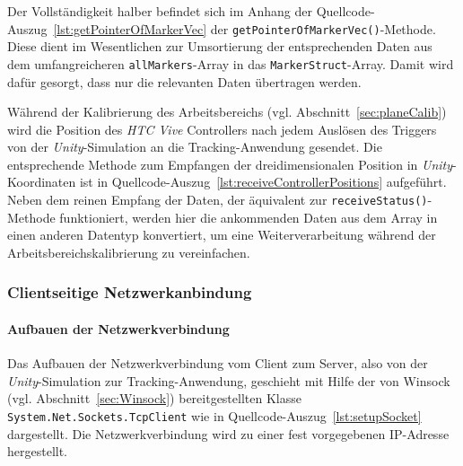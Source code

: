  

Der Vollständigkeit halber befindet sich im Anhang der Quellcode-Auszug~\ref{lst:getPointerOfMarkerVec} der \texttt{get\-Pointer\-Of\-Marker\-Vec()}-Methode. Diese dient im Wesentlichen zur Umsortierung der entsprechenden Daten aus dem umfangreicheren \texttt{allMarkers}-Array in das \texttt{Marker\-Struct}-Array. Damit wird dafür gesorgt, dass nur die relevanten Daten übertragen werden. 

 

Während der Kalibrierung des Arbeitsbereichs (vgl. Abschnitt~\ref{sec:planeCalib}) wird die Position des \emph{HTC Vive} Controllers nach jedem Auslösen des Triggers von der \textit{Unity}-Simulation an die Tracking-Anwendung gesendet. Die entsprechende Methode zum Empfangen der dreidimensionalen Position in \emph{Unity}-Koordinaten ist in Quellcode-Auszug~\ref{lst:receiveControllerPositions} aufgeführt. Neben dem reinen Empfang der Daten, der äquivalent zur \texttt{receive\-Status()}-Methode funktioniert, werden hier die ankommenden Daten aus dem Array in einen anderen Datentyp konvertiert, um eine Weiterverarbeitung während der Arbeitsbereichskalibrierung zu vereinfachen. 



\subsubsection{Clientseitige Netzwerkanbindung}%
\paragraph{Aufbauen der Netzwerkverbindung}
Das Aufbauen der Netzwerkverbindung vom Client zum Server, also von der \textit{Unity}-Simulation zur Tracking-Anwendung, geschieht mit Hilfe der von Winsock (vgl. Abschnitt~\ref{sec:Winsock}) bereitgestellten Klasse \texttt{System.Net.Sockets.TcpClient} wie in Quellcode-Auszug~\ref{lst:setupSocket} dargestellt. Die Netzwerkverbindung wird zu einer fest vorgegebenen IP-Adresse hergestellt.

